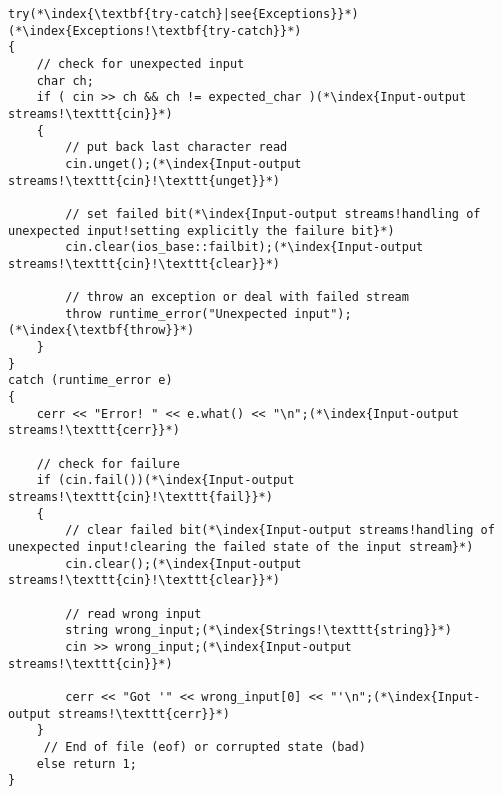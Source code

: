\documentclass[10pt]{article}
\begin{document}
\begin{lstlisting}
try(*\index{\textbf{try-catch}|see{Exceptions}}*)(*\index{Exceptions!\textbf{try-catch}}*)
{
    // check for unexpected input
    char ch;
    if ( cin >> ch && ch != expected_char )(*\index{Input-output streams!\texttt{cin}}*)
    {
        // put back last character read
        cin.unget();(*\index{Input-output streams!\texttt{cin}!\texttt{unget}}*)
        
        // set failed bit(*\index{Input-output streams!handling of unexpected input!setting explicitly the failure bit}*)
        cin.clear(ios_base::failbit);(*\index{Input-output streams!\texttt{cin}!\texttt{clear}}*)
    
        // throw an exception or deal with failed stream
        throw runtime_error("Unexpected input");(*\index{\textbf{throw}}*)
    }
}
catch (runtime_error e)
{
    cerr << "Error! " << e.what() << "\n";(*\index{Input-output streams!\texttt{cerr}}*)
            
    // check for failure
    if (cin.fail())(*\index{Input-output streams!\texttt{cin}!\texttt{fail}}*)
    {
        // clear failed bit(*\index{Input-output streams!handling of unexpected input!clearing the failed state of the input stream}*)
        cin.clear();(*\index{Input-output streams!\texttt{cin}!\texttt{clear}}*)
                
        // read wrong input
        string wrong_input;(*\index{Strings!\texttt{string}}*)
        cin >> wrong_input;(*\index{Input-output streams!\texttt{cin}}*)
                    
        cerr << "Got '" << wrong_input[0] << "'\n";(*\index{Input-output streams!\texttt{cerr}}*)
    }
     // End of file (eof) or corrupted state (bad)
    else return 1;
}
\end{lstlisting}
%
%
\end{document}
